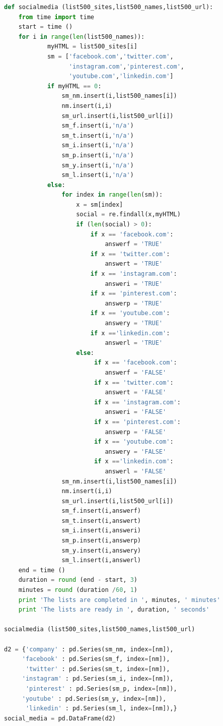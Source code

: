 \documentclass{article}
\begin{document}
\begin{lstlisting}[language=Python]
def socialmedia (list500_sites,list500_names,list500_url):
    from time import time 
    start = time ()
    for i in range(len(list500_names)):        
            myHTML = list500_sites[i]
            sm = ['facebook.com','twitter.com',
                  'instagram.com','pinterest.com',
                  'youtube.com','linkedin.com'] 
            if myHTML == 0:
                sm_nm.insert(i,list500_names[i]) 
                nm.insert(i,i)
                sm_url.insert(i,list500_url[i])
                sm_f.insert(i,'n/a')
                sm_t.insert(i,'n/a')
                sm_i.insert(i,'n/a')
                sm_p.insert(i,'n/a')
                sm_y.insert(i,'n/a')
                sm_l.insert(i,'n/a')
            else:
                for index in range(len(sm)):
                    x = sm[index]
                    social = re.findall(x,myHTML)                                
                    if (len(social) > 0):
                        if x == 'facebook.com':
                            answerf = 'TRUE'
                        if x == 'twitter.com':
                            answert = 'TRUE'
                        if x == 'instagram.com':
                            answeri = 'TRUE'
                        if x == 'pinterest.com':
                            answerp = 'TRUE'
                        if x == 'youtube.com':
                            answery = 'TRUE'
                        if x =='linkedin.com':
                            answerl = 'TRUE'                   
                    else:
                         if x == 'facebook.com':
                            answerf = 'FALSE'
                         if x == 'twitter.com':
                            answert = 'FALSE'
                         if x == 'instagram.com':
                            answeri = 'FALSE'
                         if x == 'pinterest.com':
                            answerp = 'FALSE'
                         if x == 'youtube.com':
                            answery = 'FALSE'
                         if x =='linkedin.com':
                            answerl = 'FALSE'                
                sm_nm.insert(i,list500_names[i]) 
                nm.insert(i,i)
                sm_url.insert(i,list500_url[i])
                sm_f.insert(i,answerf)
                sm_t.insert(i,answert)
                sm_i.insert(i,answeri)
                sm_p.insert(i,answerp)
                sm_y.insert(i,answery)
                sm_l.insert(i,answerl)
    end = time ()
    duration = round (end - start, 3)
    minutes = round (duration /60, 1)
    print 'The lists are completed in ', minutes, ' minutes' 
    print 'The lists are ready in ', duration, ' seconds'
 
socialmedia (list500_sites,list500_names,list500_url)

d2 = {'company' : pd.Series(sm_nm, index=[nm]),
     'facebook' : pd.Series(sm_f, index=[nm]),
      'twitter' : pd.Series(sm_t, index=[nm]),
     'instagram' : pd.Series(sm_i, index=[nm]),
      'pinterest' : pd.Series(sm_p, index=[nm]),
     'youtube' : pd.Series(sm_y, index=[nm]),
      'linkedin' : pd.Series(sm_l, index=[nm]),}
social_media = pd.DataFrame(d2) 
\end{lstlisting}
\end{document}
